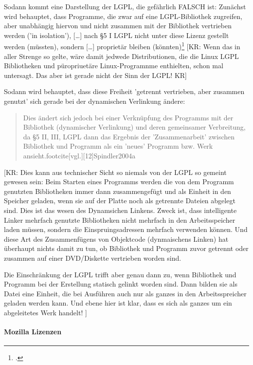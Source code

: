 \documentclass[DIV=calc,BCOR=5mm,11pt,headings=small,oneside,abstract=true, toc=bib]{scrartcl}
\begin{document}
Sodann kommt eine Darstellung der LGPL, die gefährlich FALSCH ist: Zunächst wird
behauptet, dass \glqq{}Programme, die zwar auf eine LGPL-Bibliothek zugreifen,
aber unabhängig hiervon und nicht zusammen mit der Bibliothek vertrieben werden
('in isolation'), [\ldots] nach §5 I LGPL nicht unter diese
Lizenz gestellt werden (müssten), sondern [\ldots] proprietär
bleiben (könnten)\grqq{}\footcite[vgl.][12]{Spindler2004a} [KR: Wenn das in
aller Strenge so gelte, wäre damit jedwede Distributionen, die die Linux LGPL
Bibliotheken und püropriuetäre Linux-Programnme enthielten, schon mal
untersagt. Das aber ist gerade nicht der Sinn der LGPL! KR]

Sodann wird behauptet, dass diese Freiheit 'getrennt vertrieben, aber zusammen
genutzt' sich gerade bei der \glqq{}dynamischen Verlinkung\grqq{} ändere: 
\begin{quote}\glqq{}Dies ändert sich jedoch bei einer Verknüpfung des
Programms mit der Bibliothek (dynamischer Verlinkung) und deren
gemeinsamer Verbreitung, da §5 II, III, LGPL dann das Ergebnis der
'Zusammenarbeit' zwischen Bibliothek und Programm als ein 'neues'
Programm bzw. Werk ansieht.\grqq{}footcite[vgl.][12]{Spindler2004a}
\end{quote}

[KR: Dies kann aus technischer Sicht so niemals von der LGPL so gemeint gewesen
sein: Beim Starten eines Programms werden die von dem Programm
genutzten Bibliotheken immer dann zusammengefügt und als Einheit in den Speicher
geladen, wenn sie auf der Platte noch als getrennte Dateien abgelegt sind. Dies
ist das wesen des Dynamsichen Linkens. Zweck ist, dass intelligente Linker
mehrfach genutzte Bibliotheken nicht mehrfach in den Arbeitsspeicher laden
müssen, sondern die Einspruingsadressen mehrfach verwenden können. Und diese Art
des Zusammenfügens von Objektcode (dynmaischens Linken) hat überhaupt nichts
damit zu tun, ob Bibliothek und Programm zuvor getrennt oder zusammen auf einer
DVD/Diskette vertrieben worden sind.

Die Einschränkung der LGPL trifft aber genau dann zu, wenn Bibliothek und
Programm bei der Erstellung statisch gelinkt worden sind. Dann bilden sie als
Datei eine Einheit, die bei Ausführen auch nur als ganzes in den
Arbeitsspreicher geladen werden kann. Und ebene hier ist klar, dass es sich als
ganzes um ein abgeleitetes Werk handelt!
 ]

\paragraph{Mozilla Lizenzen}
\end{document}
